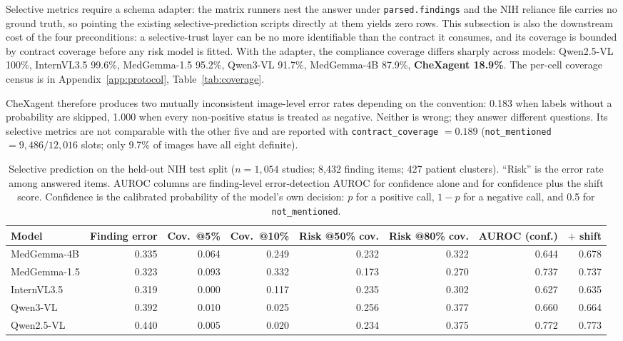 Selective metrics require a schema adapter: the matrix runners nest the answer under \texttt{parsed.findings} and the NIH reliance file carries no ground truth, so pointing the existing selective-prediction scripts directly at them yields zero rows. This subsection is also the downstream cost of the four preconditions: a selective-trust layer can be no more identifiable than the contract it consumes, and its coverage is bounded by contract coverage before any risk model is fitted. With the adapter, the compliance coverage differs sharply across models: Qwen2.5-VL 100\%, InternVL3.5 99.6\%, MedGemma-1.5 95.2\%, Qwen3-VL 91.7\%, MedGemma-4B 87.9\%, \textbf{CheXagent 18.9\%}. The per-cell coverage census is in Appendix~\ref{app:protocol}, Table~\ref{tab:coverage}.

CheXagent therefore produces two mutually inconsistent image-level error rates depending on the convention: 0.183 when labels without a probability are skipped, 1.000 when every non-positive status is treated as negative. Neither is wrong; they answer different questions. Its selective metrics are not comparable with the other five and are reported with \texttt{contract\_coverage} $=0.189$ (\texttt{not\_mentioned} $=9{,}486/12{,}016$ slots; only 9.7\% of images have all eight definite).

\begin{table}[t]
\centering
\footnotesize
\caption{Selective prediction on the held-out NIH test split ($n=1{,}054$ studies; 8,432 finding items; 427 patient clusters). ``Risk'' is the error rate among answered items. AUROC columns are finding-level error-detection AUROC for confidence alone and for confidence plus the shift score. Confidence is the calibrated probability of the model's own decision: $p$ for a positive call, $1-p$ for a negative call, and 0.5 for \texttt{not\_mentioned}.}
\label{tab:selective}
\begin{tabular}{lrrrrrrr}
\toprule
Model & Finding error & Cov.\ @5\% & Cov.\ @10\% & Risk @50\% cov. & Risk @80\% cov. & AUROC (conf.) & $+$ shift \\
\midrule
MedGemma-4B & 0.335 & 0.064 & 0.249 & 0.232 & 0.322 & 0.644 & 0.678 \\
MedGemma-1.5 & 0.323 & 0.093 & 0.332 & 0.173 & 0.270 & 0.737 & 0.737 \\
InternVL3.5 & 0.319 & 0.000 & 0.117 & 0.235 & 0.302 & 0.627 & 0.635 \\
Qwen3-VL & 0.392 & 0.010 & 0.025 & 0.256 & 0.377 & 0.660 & 0.664 \\
Qwen2.5-VL & 0.440 & 0.005 & 0.020 & 0.234 & 0.375 & 0.772 & 0.773 \\
\bottomrule
\end{tabular}
\end{table}

